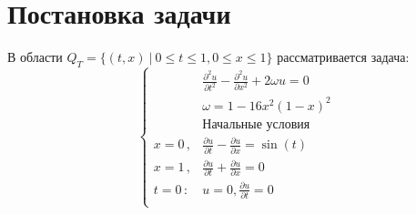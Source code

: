 \documentclass[12pt,eqnleft,executivepaper]{article}
\begin{document}
\begin{comment}
\begin{titlepage} 
	
	\begin{center} 
		\large 
		
		МОСКОВСКИЙ ГОСУДАРСТВЕННЫЙ УНИВЕРСИТЕТ \\ ИМ. М. В. ЛОМОНОСОВА 
		\vspace{0.25cm} 
		
		Механико-математический факультет 
		
		
		
		Мочалов Максим Сергеевич
		\vfill 
		
		\textsc{Отчет 8 семестра. Задача 3.21 из В.Ф. Дьяченко}\\[5mm] 
		
		\bigskip 
		
		4 курс, группа 424 
	\end{center} 
	\vfill 
	
	
	\begin{center} 
		Москва, 2019 г. 
	\end{center} 
\end{titlepage}
\end{comment}
\tableofcontents
\newpage
\section{Постановка задачи}
В области $Q_T = \{(t, x) \ | \ 0 \leq t \leq 1, 0 \leq x \leq 1\}$ рассматривается задача:
\begin{equation*}
   \left\{
        \begin{aligned}
&\frac{\partial^2 u}{\partial t^2}-\frac{\partial^2 u}{\partial x^2}+2\omega u =0\\
&\omega = 1-16x^2(1-x)^2\\
&\text{Начальные условия}\\
x=0\,,&\frac{\partial u}{\partial t}-\frac{\partial u}{\partial x}= \sin(t)\\
x=1\,,&\frac{\partial u}{\partial t}+\frac{\partial u}{\partial x}= 0\\
t=0\,:& u=0, \frac{\partial u}{\partial t}=0\\
\end{aligned}\right.
\end{equation*}
\end{document}
